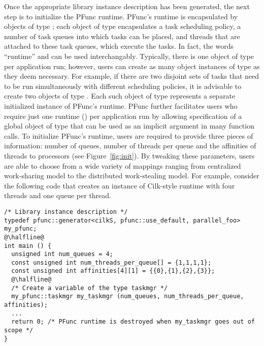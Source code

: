 Once the appropriate library instance description has been generated, the next
step is to initialize the PFunc runtime. 
%
PFunc's runtime is encapsulated by objects of type ; each object
of type  encapsulates a task scheduling policy, a number of task
queues into which tasks can be placed, and threads that are attached to these
task queues, which execute the tasks.
%
In fact, the words ``runtime'' and  can be used interchangably.
%
Typically, there is one object of type  per application run; 
however, 
users can create as many object instances of type  as
they deem necessary.
%
For example, if there are two disjoint sets of
tasks that need to be run simultaneously with different scheduling policies, it
is advisable to create two objects of type . 
%
Each such object of
type  represents a separate initialized instance of PFunc's
runtime.
%
PFunc further facilitates users who require just one runtime ()
per application run by allowing specification of a global object of type
 that can be used as an implicit argument in many function calls.
%
To initialize PFunc's runtime, users are required to provide three pieces of
information: number of queues, number of threads per queue and the affinities
of threads to processors (see Figure~\ref{fig:init}).
%
By tweaking these parameters, users are able to choose from a wide variety of
mappings ranging from centralized work-sharing model to the distributed
work-stealing model. 
%
For example, consider the following code that creates an instance of Cilk-style
runtime with four threads and one queue per thread.
%
\begin{lstlisting}
/* Library instance description */
typedef pfunc::generator<cilkS, pfunc::use_default, parallel_foo> my_pfunc;
@\halfline@
int main () {
  unsigned int num_queues = 4;
  const unsigned int num_threads_per_queue[] = {1,1,1,1};
  const unsigned int affinities[4][1] = {{0},{1},{2},{3}};
  @\halfline@
  /* Create a variable of the type taskmgr */
  my_pfunc::taskmgr my_taskmgr (num_queues, num_threads_per_queue, affinities);
  ...
  return 0; /* PFunc runtime is destroyed when my_taskmgr goes out of scope */
}
\end{lstlisting}

